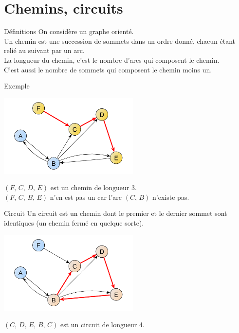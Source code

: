 \documentclass[10pt]{beamer}
\begin{document}
\section*{Chemins, circuits}
\begin{frame}{Définitions}
On considère un graphe orienté.\\

Un \alert{chemin} est une succession de sommets dans un ordre donné, chacun étant relié au suivant par un arc.\\

La \alert{longueur} du chemin, c'est le nombre d'arcs qui composent le chemin.\\
C'est aussi le nombre de sommets qui composent le chemin moins un.
\end{frame}
\begin{frame}{Exemple}
\begin{center}
\includegraphics[width=7cm]{img/chemin.png}
\end{center}
$(F,\,C,\,D,\,E)$ est un chemin de longueur 3.\\

$(F,\,C,\,B,\,E)$ n'en est pas un car l'arc $(C,\,B)$ n'existe pas. 
\end{frame}
\begin{frame}{Circuit}
Un \alert{circuit} est un chemin dont le premier et le dernier sommet sont identiques (un chemin \og fermé\fg{} en quelque sorte).
\begin{center}
\includegraphics[width=7cm]{img/circuit.png}
\end{center}
$(C,\,D,\,E,\,B,\,C)$ est un circuit de longueur 4.
\end{frame}
\end{document}
